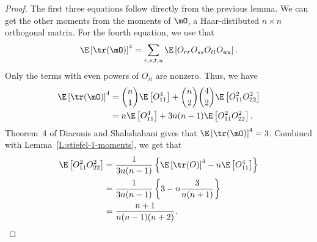 \begin{proof}
    The first three equations follow directly from the previous lemma.
    We can get the other moments from the moments of $\mO$, a Haar-distibuted
    $n \times n$ orthogonal matrix. For the fourth equation, we use that 
    \[
        \E \left[ \tr( \mO ) \right]^4
        =
        \sum_{r,s,t,u} \E \left[ O_{rr} O_{ss} O_{tt} O_{uu} \right].
    \]
    Only the terms with even powers of $O_{ii}$ are nonzero.  Thus, we have
    \begin{align*}
        \E \left[ \tr( \mO ) \right]^4
        &=   \binom{n}{1} \E \left[ O_{11}^4 \right]
           + \binom{n}{2} \binom{4}{2} \E \left[ O_{11}^2 O_{22}^2 \right] \\
        &=   n \E \left[ O_{11}^4 \right]
           + 3n(n-1) \E \left[ O_{11}^2 O_{22}^2 \right].
    \end{align*}
    Theorem~4 of Diaconis and Shahshahani \cite{diaconis1994erm} gives that 
    $\E \left[ \tr(\mO) \right]^4 = 3$.  Combined with
    Lemma~\ref{L:stiefel-1-moments}, we get that
    \begin{align*}
        \E \left[ O_{11}^2 O_{22}^2 \right]
        &= \frac{1}{3n(n-1)} 
            \left\{
                \E \left[ \tr(O) \right]^4
                - n \E \left[ O_{11}^4 \right]
            \right\} \\
        &= \frac{1}{3n(n-1)} 
           \left\{
                3 - n \frac{3}{n(n+1)}
           \right\} \\
        &= \frac{n+1}{n(n-1)(n+2)}.
    \end{align*}
    

\end{proof}
